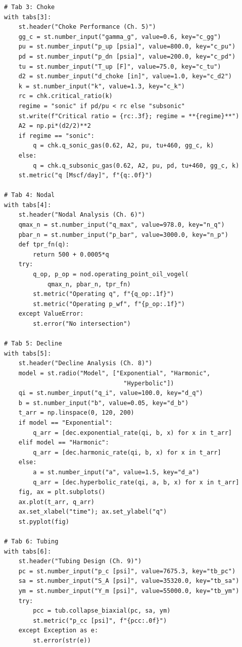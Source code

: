 \documentclass[10pt,a4paper,openany]{book}
\begin{document}
\begin{lstlisting}
# Tab 3: Choke
with tabs[3]:
    st.header("Choke Performance (Ch. 5)")
    gg_c = st.number_input("gamma_g", value=0.6, key="c_gg")
    pu = st.number_input("p_up [psia]", value=800.0, key="c_pu")
    pd = st.number_input("p_dn [psia]", value=200.0, key="c_pd")
    tu = st.number_input("T_up [F]", value=75.0, key="c_tu")
    d2 = st.number_input("d_choke [in]", value=1.0, key="c_d2")
    k = st.number_input("k", value=1.3, key="c_k")
    rc = chk.critical_ratio(k)
    regime = "sonic" if pd/pu < rc else "subsonic"
    st.write(f"Critical ratio = {rc:.3f}; regime = **{regime}**")
    A2 = np.pi*(d2/2)**2
    if regime == "sonic":
        q = chk.q_sonic_gas(0.62, A2, pu, tu+460, gg_c, k)
    else:
        q = chk.q_subsonic_gas(0.62, A2, pu, pd, tu+460, gg_c, k)
    st.metric("q [Mscf/day]", f"{q:.0f}")

# Tab 4: Nodal
with tabs[4]:
    st.header("Nodal Analysis (Ch. 6)")
    qmax_n = st.number_input("q_max", value=978.0, key="n_q")
    pbar_n = st.number_input("p_bar", value=3000.0, key="n_p")
    def tpr_fn(q):
        return 500 + 0.0005*q
    try:
        q_op, p_op = nod.operating_point_oil_vogel(
            qmax_n, pbar_n, tpr_fn)
        st.metric("Operating q", f"{q_op:.1f}")
        st.metric("Operating p_wf", f"{p_op:.1f}")
    except ValueError:
        st.error("No intersection")

# Tab 5: Decline
with tabs[5]:
    st.header("Decline Analysis (Ch. 8)")
    model = st.radio("Model", ["Exponential", "Harmonic",
                                 "Hyperbolic"])
    qi = st.number_input("q_i", value=100.0, key="d_q")
    b = st.number_input("b", value=0.05, key="d_b")
    t_arr = np.linspace(0, 120, 200)
    if model == "Exponential":
        q_arr = [dec.exponential_rate(qi, b, x) for x in t_arr]
    elif model == "Harmonic":
        q_arr = [dec.harmonic_rate(qi, b, x) for x in t_arr]
    else:
        a = st.number_input("a", value=1.5, key="d_a")
        q_arr = [dec.hyperbolic_rate(qi, a, b, x) for x in t_arr]
    fig, ax = plt.subplots()
    ax.plot(t_arr, q_arr)
    ax.set_xlabel("time"); ax.set_ylabel("q")
    st.pyplot(fig)

# Tab 6: Tubing
with tabs[6]:
    st.header("Tubing Design (Ch. 9)")
    pc = st.number_input("p_c [psi]", value=7675.3, key="tb_pc")
    sa = st.number_input("S_A [psi]", value=35320.0, key="tb_sa")
    ym = st.number_input("Y_m [psi]", value=55000.0, key="tb_ym")
    try:
        pcc = tub.collapse_biaxial(pc, sa, ym)
        st.metric("p_cc [psi]", f"{pcc:.0f}")
    except Exception as e:
        st.error(str(e))


\end{lstlisting}
\end{document}
